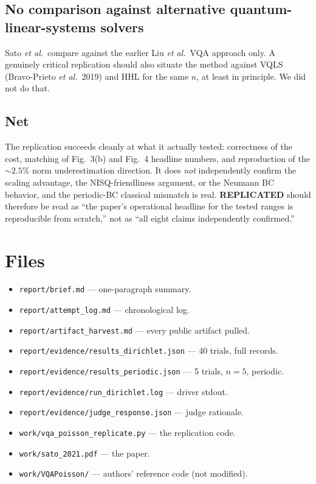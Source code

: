 \documentclass[11pt]{article}
\begin{document}
\subsection{No comparison against alternative quantum-linear-systems solvers}
Sato \emph{et al.}\ compare against the earlier Liu \emph{et al.}\ VQA approach only.
A genuinely critical replication should also situate the method against VQLS
(Bravo-Prieto \emph{et al.}\ 2019) and HHL for the same $n$, at least in principle.
We did not do that.

\subsection{Net}
The replication succeeds cleanly at what it actually tested: correctness of the
cost, matching of Fig.~3(b) and Fig.~4 headline numbers, and reproduction of the
$\sim\!2.5\%$ norm underestimation direction. It does \emph{not} independently
confirm the scaling advantage, the NISQ-friendliness argument, or the Neumann BC
behavior, and the periodic-BC classical mismatch is real. \textbf{REPLICATED}
should therefore be read as ``the paper's operational headline for the tested
ranges is reproducible from scratch,'' not as ``all eight claims independently
confirmed.''

\section{Files}
\begin{itemize}
\item \verb|report/brief.md| --- one-paragraph summary.
\item \verb|report/attempt_log.md| --- chronological log.
\item \verb|report/artifact_harvest.md| --- every public artifact pulled.
\item \verb|report/evidence/results_dirichlet.json| --- 40 trials, full records.
\item \verb|report/evidence/results_periodic.json| --- 5 trials, $n=5$, periodic.
\item \verb|report/evidence/run_dirichlet.log| --- driver stdout.
\item \verb|report/evidence/judge_response.json| --- judge rationale.
\item \verb|work/vqa_poisson_replicate.py| --- the replication code.
\item \verb|work/sato_2021.pdf| --- the paper.
\item \verb|work/VQAPoisson/| --- authors' reference code (not modified).
\end{itemize}
\end{document}
